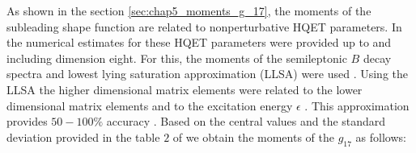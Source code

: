 As shown in the section \ref{sec:chap5_moments_g_17}, the moments of the subleading shape function are related to nonperturbative HQET parameters. In \cite{Gambino:2016jkc} the numerical estimates for these HQET parameters were provided up to and including dimension eight. For this, the moments of the semileptonic $B$ decay spectra and lowest lying saturation approximation (LLSA) were used \cite{Mannel:2010wj,Heinonen:2014dxa}. Using the LLSA the higher dimensional matrix elements were related to the lower dimensional matrix elements and to the excitation energy $\epsilon$ \cite{Gambino:2016jkc}. This approximation provides $50-100\%$ accuracy \cite{Heinonen:2014dxa}. Based on the central values and the standard deviation provided in the table $2$ of \cite{Gambino:2016jkc} we obtain the moments of the $g_{17}$ as follows:

